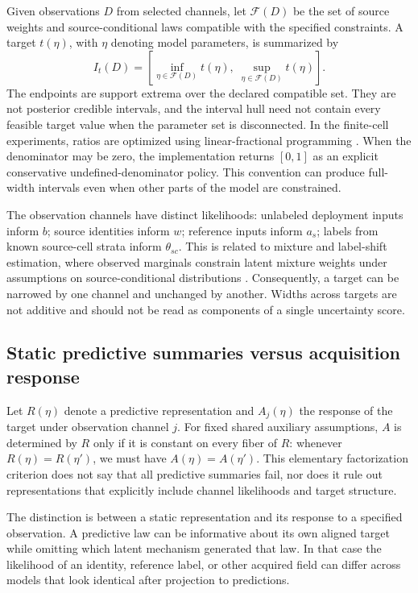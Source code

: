 \documentclass[11pt]{article}
\begin{document}
Given observations $D$ from selected channels, let $\mathcal{F}(D)$ be the set of source weights and source-conditional laws compatible with the specified constraints. A target $t(\eta)$, with $\eta$ denoting model parameters, is summarized by
\begin{equation}
 I_t(D)=\left[\inf_{\eta\in\mathcal{F}(D)}t(\eta),\;\sup_{\eta\in\mathcal{F}(D)}t(\eta)\right].
\end{equation}
The endpoints are support extrema over the declared compatible set. They are not posterior credible intervals, and the interval hull need not contain every feasible target value when the parameter set is disconnected. In the finite-cell experiments, ratios are optimized using linear-fractional programming \citep{charnes1962}. When the denominator may be zero, the implementation returns $[0,1]$ as an explicit conservative undefined-denominator policy. This convention can produce full-width intervals even when other parts of the model are constrained.

The observation channels have distinct likelihoods: unlabeled deployment inputs inform $b$; source identities inform $w$; reference inputs inform $a_s$; labels from known source-cell strata inform $\theta_{sc}$. This is related to mixture and label-shift estimation, where observed marginals constrain latent mixture weights under assumptions on source-conditional distributions \citep{lipton2018}. Consequently, a target can be narrowed by one channel and unchanged by another. Widths across targets are not additive and should not be read as components of a single uncertainty score.

\subsection{Static predictive summaries versus acquisition response}

Let $R(\eta)$ denote a predictive representation and $A_j(\eta)$ the response of the target under observation channel $j$. For fixed shared auxiliary assumptions, $A$ is determined by $R$ only if it is constant on every fiber of $R$: whenever $R(\eta)=R(\eta')$, we must have $A(\eta)=A(\eta')$. This elementary factorization criterion does not say that all predictive summaries fail, nor does it rule out representations that explicitly include channel likelihoods and target structure.

The distinction is between a static representation and its response to a specified observation. A predictive law can be informative about its own aligned target while omitting which latent mechanism generated that law. In that case the likelihood of an identity, reference label, or other acquired field can differ across models that look identical after projection to predictions.
\end{document}
